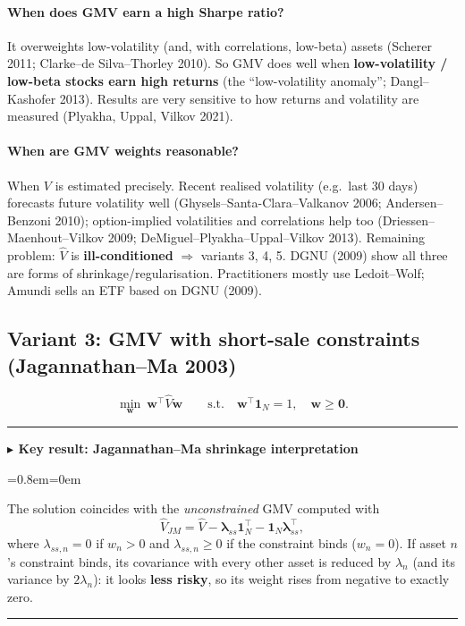 \documentclass[11pt,a4paper]{report}
\newenvironment{notebox}[1]
  {\par\medskip\Needspace{6\baselineskip}\noindent\rule{\linewidth}{0.4pt}\par\nopagebreak
   \noindent\textbf{#1}\par\nopagebreak
   \begin{list}{}{\leftmargin=0.8em\rightmargin=0em\topsep=2pt}\item[]}
  {\end{list}\nopagebreak\noindent\rule{\linewidth}{0.4pt}\par\medskip}
\newenvironment{keybox}[1][]{\begin{notebox}{$\blacktriangleright$ Key result#1}}{\end{notebox}}
\newcommand{\one}{\mathbf{1}_N}
\newcommand{\w}{\bm{w}}
\newcommand{\T}{^{\top}}
\begin{document}
\paragraph{When does GMV earn a high Sharpe ratio?} It overweights low-volatility
(and, with correlations, low-beta) assets (Scherer 2011; Clarke--de Silva--Thorley 2010).
So GMV does well when \textbf{low-volatility / low-beta stocks earn high returns}
(the ``low-volatility anomaly''; Dangl--Kashofer 2013). Results are very sensitive
to how returns and volatility are measured (Plyakha, Uppal, Vilkov 2021).

\paragraph{When are GMV weights reasonable?} When $V$ is estimated precisely.
Recent realised volatility (e.g.\ last 30 days) forecasts future volatility well
(Ghysels--Santa-Clara--Valkanov 2006; Andersen--Benzoni 2010); option-implied
volatilities and correlations help too (Driessen--Maenhout--Vilkov 2009;
DeMiguel--Plyakha--Uppal--Vilkov 2013). Remaining problem: $\hat V$ is
\textbf{ill-conditioned} $\Rightarrow$ variants 3, 4, 5. DGNU (2009) show all
three are forms of shrinkage/regularisation. Practitioners mostly use
Ledoit--Wolf; Amundi sells an ETF based on DGNU (2009).

\subsection{Variant 3: GMV with short-sale constraints (Jagannathan--Ma 2003)}
\[
\min_{\w}\ \w\T\hat V\w\qquad\text{s.t.}\quad\w\T\one=1,\quad\w\ge\bm0 .
\]
\begin{keybox}[: Jagannathan--Ma shrinkage interpretation]
The solution coincides with the \emph{unconstrained} GMV computed with
\[
\hat V_{JM}=\hat V-\bm\lambda_{ss}\one\T-\one\bm\lambda_{ss}\T,
\]
where $\lambda_{ss,n}=0$ if $w_n>0$ and $\lambda_{ss,n}\ge0$ if the constraint binds ($w_n=0$).
If asset $n$'s constraint binds, its covariance with every other asset is reduced by
$\lambda_n$ (and its variance by $2\lambda_n$): it looks \textbf{less risky}, so its weight
rises from negative to exactly zero.
\end{keybox}
\end{document}
